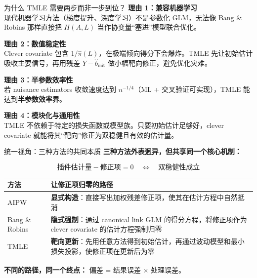 \documentclass[aspectratio=169,10pt]{beamer}
\begin{document}
	\begin{frame}{为什么 TMLE 需要两步而非一步到位？}
		\textbf{理由 1：兼容机器学习}\\
		现代机器学习方法（梯度提升、深度学习）不是参数化 GLM，无法像 Bang \& Robins 那样直接把 $H(A,L)$ 当作协变量“塞进”模型联合优化。
		
		\textbf{理由 2：数值稳定性}\\
		Clever covariate 包含 $1/\widehat{\pi}(L)$，在极端倾向得分下会爆炸。TMLE 先让初始估计吸收主要信号，再用残差 $Y - \widehat{b}_{\text{init}}$ 做小幅靶向修正，避免优化灾难。
		
		\textbf{理由 3：半参数效率性}\\
		若 nuisance estimators 收敛速度达到 $n^{-1/4}$（ML + 交叉验证可实现），TMLE 能达到\textbf{半参数效率界}。
		
		\textbf{理由 4：模块化与通用性}\\
		TMLE 不依赖于特定的损失函数或模型族。只要初始估计足够好，clever covariate 就能将其“靶向”修正为双稳健且有效的估计量。
	\end{frame}
	
	\begin{frame}{统一视角：三种方法的共同本质}
		\textbf{三种方法外表迥异，但共享同一个核心机制：}
		
		\[
		\text{插件估计量} - \text{修正项} = 0 \quad \Longleftrightarrow \quad \text{双稳健性成立}
		\]
		
		\begin{center}
			\begin{tabular}{p{3.5cm}p{9cm}}
				\toprule
				\textbf{方法} & \textbf{让修正项归零的路径} \\
				\midrule
				AIPW & \textbf{显式构造}：直接写出加权残差修正项，使其在估计方程中自然抵消 \\
				Bang \& Robins & \textbf{隐式强制}：通过 canonical link GLM 的得分方程，将修正项作为 clever covariate 的估计方程强制归零 \\
				TMLE & \textbf{靶向更新}：先用任意方法得到初始估计，再通过波动模型和最小损失投影，使修正项在更新后为零 \\
				\bottomrule
			\end{tabular}
		\end{center}
		
		\textbf{不同的路径，同一个终点：} 偏差 = 结果误差 $\times$ 处理误差。
	\end{frame}
	
\end{document}
